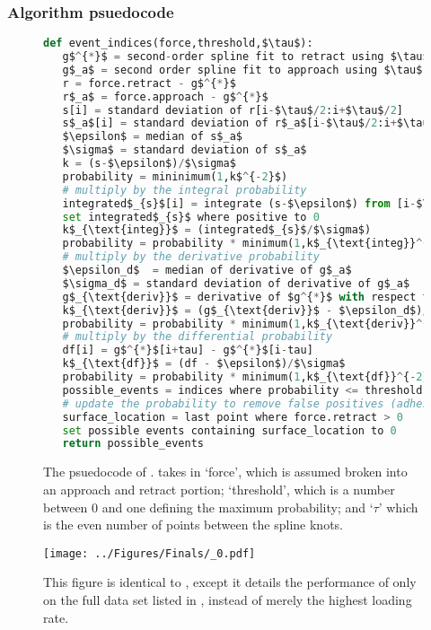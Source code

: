 \clearpage

\subsubsection{Algorithm psuedocode}

\begin{figure}
  \begin{lstlisting}[language=Python]
def event_indices(force,threshold,$\tau$):
   g$^{*}$ = second-order spline fit to retract using $\tau$ for knots
   g$_a$ = second order spline fit to approach using $\tau$ for knots
   r = force.retract - g$^{*}$
   r$_a$ = force.approach - g$^{*}$
   s[i] = standard deviation of r[i-$\tau$/2:i+$\tau$/2]
   s$_a$[i] = standard deviation of r$_a$[i-$\tau$/2:i+$\tau$/2]
   $\epsilon$ = median of s$_a$
   $\sigma$ = standard deviation of s$_a$
   k = (s-$\epsilon$)/$\sigma$
   probability = mininimum(1,k$^{-2}$)
   # multiply by the integral probability 
   integrated$_{s}$[i] = integrate (s-$\epsilon$) from [i-$\tau$] to [i+$\tau$]
   set integrated$_{s}$ where positive to 0
   k$_{\text{integ}}$ = (integrated$_{s}$/$\sigma$)
   probability = probability * minimum(1,k$_{\text{integ}}^{-2}$)
   # multiply by the derivative probability
   $\epsilon_d$  = median of derivative of g$_a$
   $\sigma_d$ = standard deviation of derivative of g$_a$
   g$_{\text{deriv}}$ = derivative of $g^{*}$ with respect to time
   k$_{\text{deriv}}$ = (g$_{\text{deriv}}$ - $\epsilon_d$)/$\sigma_d$
   probability = probability * minimum(1,k$_{\text{deriv}}^{-2}$)
   # multiply by the differential probability 
   df[i] = g$^{*}$[i+tau] - g$^{*}$[i-tau]
   k$_{\text{df}}$ = (df - $\epsilon$)/$\sigma$
   probability = probability * minimum(1,k$_{\text{df}}^{-2}$)
   possible_events = indices where probability <= threshold
   # update the probability to remove false positives (adhesions)
   surface_location = last point where force.retract > 0
   set possible events containing surface_location to 0
   return possible_events
\end{lstlisting}
\caption[\name{} psuedocode]{\noindent{}\pStartF The psuedocode of \name{}. \name{} takes in `force', which is assumed broken into an approach and retract portion; `threshold', which is a number between 0 and one defining the maximum probability; and `$\tau$' which is the even number of points between the spline knots. \pEndF }
\end{figure}

\clearpage


\begin{figure}
\centering
\texttt{[image: ../Figures/Finals/\_0.pdf]}%
\caption[Performance of \name{} on larger data set]{\noindent{}\pStartF This figure is identical to , except it details the performance of only \name{} on the full data set listed in , instead of merely the highest loading rate.  \pEndF }
\end{figure}

